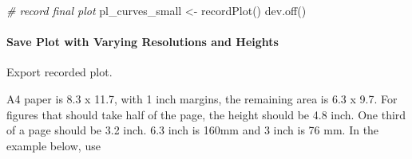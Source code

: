 \documentclass[
]{book}
\newenvironment{Shaded}{\begin{snugshade}}{\end{snugshade}}
\newcommand{\CommentTok}[1]{\textcolor[rgb]{0.56,0.35,0.01}{\textit{#1}}}
\newcommand{\FunctionTok}[1]{\textcolor[rgb]{0.00,0.00,0.00}{#1}}
\newcommand{\NormalTok}[1]{#1}
\newcommand{\OtherTok}[1]{\textcolor[rgb]{0.56,0.35,0.01}{#1}}
\begin{document}
\begin{Shaded}
\begin{Highlighting}[]
\CommentTok{\# record final plot}
\NormalTok{pl\_curves\_small }\OtherTok{\textless{}{-}} \FunctionTok{recordPlot}\NormalTok{()}
\FunctionTok{dev.off}\NormalTok{()}
\end{Highlighting}
\end{Shaded}

\hypertarget{save-plot-with-varying-resolutions-and-heights}{%
\paragraph{Save Plot with Varying Resolutions and Heights}\label{save-plot-with-varying-resolutions-and-heights}}

Export recorded plot.

A4 paper is 8.3 x 11.7, with 1 inch margins, the remaining area is 6.3 x 9.7. For figures that should take half of the page, the height should be 4.8 inch. One third of a page should be 3.2 inch. 6.3 inch is 160mm and 3 inch is 76 mm. In the example below, use
\end{document}
